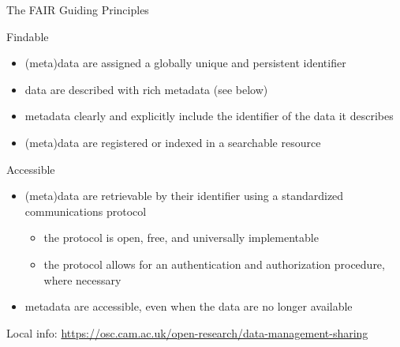 \documentclass[ignorenonframetext,aspectratio=169,10pt,xcolor=table]{beamer}
\begin{document}



\begin{frame}{The FAIR Guiding Principles}
  \begin{block}{Findable}
    \begin{itemize}
    \item (meta)data are assigned a globally unique and persistent identifier
    \item data are described with rich metadata (see below)
    \item metadata clearly and explicitly include the identifier of the data it describes
    \item (meta)data are registered or indexed in a searchable resource
    \end{itemize}
  \end{block}

  \begin{block}{Accessible}
    \begin{itemize}
    \item (meta)data are retrievable by their identifier using a standardized communications protocol
      \begin{itemize}
      \item the protocol is open, free, and universally implementable
      \item the protocol allows for an authentication and authorization procedure, where necessary
      \end{itemize}
    \item metadata are accessible, even when the data are no longer available
    \end{itemize}
  \end{block}

  \begin{flushright}
    {\tiny
      Local info: \url{https://osc.cam.ac.uk/open-research/data-management-sharing}}
  \end{flushright}
\end{frame}
\end{document}
